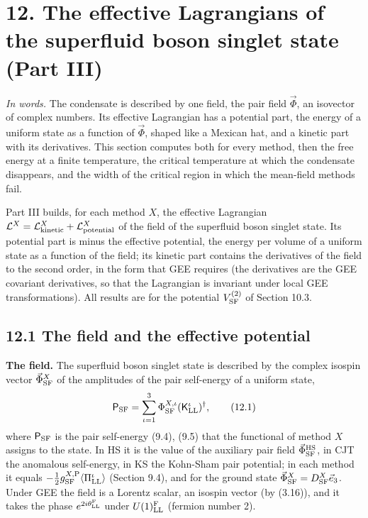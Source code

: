 \documentclass[
  10pt,
]{article}
\begin{document}
\hypertarget{the-effective-lagrangians-of-the-superfluid-boson-singlet-state-part-iii}{%
\section{12. The effective Lagrangians of the superfluid boson singlet
state (Part
III)}\label{the-effective-lagrangians-of-the-superfluid-boson-singlet-state-part-iii}}

\emph{In words.} The condensate is described by one field, the pair
field \(\vec\Phi\), an isovector of complex numbers. Its effective
Lagrangian has a potential part, the energy of a uniform state as a
function of \(\vec\Phi\), shaped like a Mexican hat, and a kinetic part
with its derivatives. This section computes both for every method, then
the free energy at a finite temperature, the critical temperature at
which the condensate disappears, and the width of the critical region in
which the mean-field methods fail.

Part III builds, for each method \(X\), the effective Lagrangian
\(\mathcal L^X=\mathcal L^X_{\rm kinetic}+\mathcal L^X_{\rm potential}\)
of the field of the superfluid boson singlet state. Its potential part
is minus the effective potential, the energy per volume of a uniform
state as a function of the field; its kinetic part contains the
derivatives of the field to the second order, in the form that GEE
requires (the derivatives are the GEE covariant derivatives, so that the
Lagrangian is invariant under local GEE transformations). All results
are for the potential \(V^{(2)}_{\rm SF}\) of Section 10.3.

\hypertarget{the-field-and-the-effective-potential}{%
\subsection{12.1 The field and the effective
potential}\label{the-field-and-the-effective-potential}}

\textbf{The field.} The superfluid boson singlet state is described by
the complex isospin vector \(\vec\Phi^X_{\rm SF}\) of the amplitudes of
the pair self-energy of a uniform state,
\[\mathsf P_{\rm SF}=\sum_{\iota=1}^3\Phi^{X,\iota}_{\rm SF}(\mathsf K^\iota_{\rm LL})^\dagger,\tag{12.1}\]
where \(\mathsf P_{\rm SF}\) is the pair self-energy (9.4), (9.5) that
the functional of method \(X\) assigns to the state. In HS it is the
value of the auxiliary pair field \(\vec\Phi^{\rm HS}_{\rm SF}\), in CJT
the anomalous self-energy, in KS the Kohn-Sham pair potential; in each
method it equals
\(-\tfrac12g^{X,{\rm P}}_{\rm SF}\langle\Pi^\iota_{\rm LL}\rangle\)
(Section 9.4), and for the ground state
\(\vec\Phi^X_{\rm SF}=D^X_{\rm SF}\vec e_3\). Under GEE the field is a
Lorentz scalar, an isospin vector (by (3.16)), and it takes the phase
\(e^{2i\theta^{\rm F}_{\rm LL}}\) under \(U(1)^{\rm F}_{\rm LL}\)
(fermion number 2).
\end{document}
